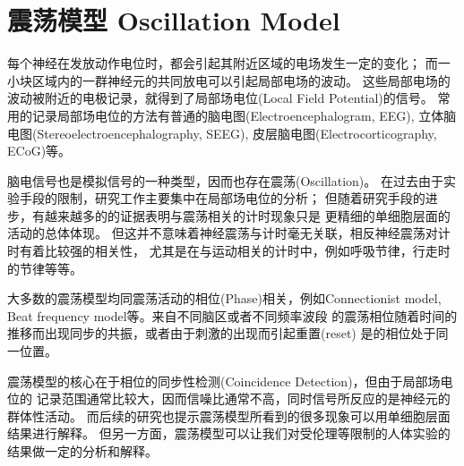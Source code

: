 \section{震荡模型 Oscillation Model}
每个神经在发放动作电位时，都会引起其附近区域的电场发生一定的变化；
而一小块区域内的一群神经元的共同放电可以引起局部电场的波动。
这些局部电场的波动被附近的电极记录，就得到了局部场电位(Local Field Potential)的信号。
常用的记录局部场电位的方法有普通的脑电图(Electroencephalogram, EEG),
立体脑电图(Stereoelectroencephalography, SEEG), 皮层脑电图(Electrocorticography, ECoG)等。

脑电信号也是模拟信号的一种类型，因而也存在震荡(Oscillation)。
在过去由于实验手段的限制，研究工作主要集中在局部场电位的分析；
但随着研究手段的进步，有越来越多的的证据表明与震荡相关的计时现象只是
更精细的单细胞层面的活动的总体体现\cite{paton2018neural}。
但这并不意味着神经震荡与计时毫无关联，相反神经震荡对计时有着比较强的相关性，
尤其是在与运动相关的计时中，例如呼吸节律，行走时的节律等等\cite{paton2018neural}。

大多数的震荡模型均同震荡活动的相位(Phase)相关，例如Connectionist model,
Beat frequency model等\cite{matell2004cortico}。来自不同脑区或者不同频率波段
的震荡相位随着时间的推移而出现同步的共振，或者由于刺激的出现而引起重置(reset)
是的相位处于同一位置。

震荡模型的核心在于相位的同步性检测(Coincidence Detection)，但由于局部场电位的
记录范围通常比较大，因而信噪比通常不高，同时信号所反应的是神经元的群体性活动。
而后续的研究也提示震荡模型所看到的很多现象可以用单细胞层面结果进行解释。
但另一方面，震荡模型可以让我们对受伦理等限制的人体实验的结果做一定的分析和解释。
